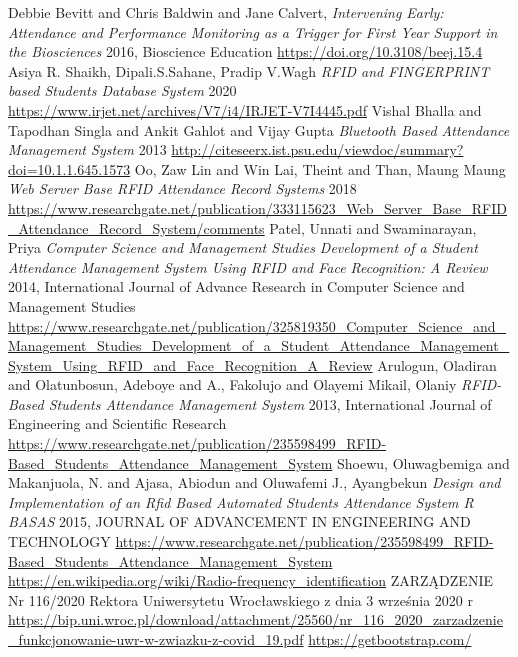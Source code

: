 \documentclass[declaration,shortabstract, mgr]{iithesis}
\begin{document}
\begin{thebibliography}{9}
		Debbie Bevitt and Chris Baldwin and Jane Calvert,
		\textit{Intervening Early: Attendance and Performance Monitoring as a Trigger for First Year Support in the Biosciences}
		2016, Bioscience Education
		\url{https://doi.org/10.3108/beej.15.4}
		Asiya R. Shaikh, Dipali.S.Sahane, Pradip V.Wagh
		\textit{RFID and FINGERPRINT based Students Database System}
		2020
		\url{https://www.irjet.net/archives/V7/i4/IRJET-V7I4445.pdf}
		Vishal Bhalla and Tapodhan Singla and Ankit Gahlot and Vijay Gupta
		\textit{Bluetooth Based Attendance Management System}
		2013
		\url{http://citeseerx.ist.psu.edu/viewdoc/summary?doi=10.1.1.645.1573}
		Oo, Zaw Lin and Win Lai, Theint and Than, Maung Maung
		\textit{Web Server Base RFID Attendance Record Systems}
		2018
		\url{https://www.researchgate.net/publication/333115623_Web_Server_Base_RFID_Attendance_Record_System/comments}
		Patel, Unnati and Swaminarayan, Priya
		\textit{Computer Science and Management Studies Development of a Student Attendance Management System Using RFID and Face Recognition: A Review}
		2014, International Journal of Advance Research in Computer Science and Management Studies
		\url{https://www.researchgate.net/publication/325819350_Computer_Science_and_Management_Studies_Development_of_a_Student_Attendance_Management_System_Using_RFID_and_Face_Recognition_A_Review}
		Arulogun, Oladiran and Olatunbosun, Adeboye and A., Fakolujo and Olayemi Mikail, Olaniy
		\textit{RFID-Based Students Attendance Management System}
		2013, International Journal of Engineering and Scientific Research
		\url{https://www.researchgate.net/publication/235598499_RFID-Based_Students_Attendance_Management_System}
		Shoewu, Oluwagbemiga and Makanjuola, N. and Ajasa, Abiodun and Oluwafemi J., Ayangbekun
		\textit{Design and Implementation of an Rfid Based Automated Students Attendance System R BASAS}
		2015, JOURNAL OF ADVANCEMENT IN ENGINEERING AND TECHNOLOGY
		\url{https://www.researchgate.net/publication/235598499_RFID-Based_Students_Attendance_Management_System}
		\url{https://en.wikipedia.org/wiki/Radio-frequency_identification}	
		ZARZĄDZENIE Nr 116/2020 Rektora Uniwersytetu Wrocławskiego z dnia 3 września 2020 r
		\url{https://bip.uni.wroc.pl/download/attachment/25560/nr_116_2020_zarzadzenie_funkcjonowanie-uwr-w-zwiazku-z-covid_19.pdf}
		\url{https://getbootstrap.com/}	

\end{thebibliography}
\end{document}
